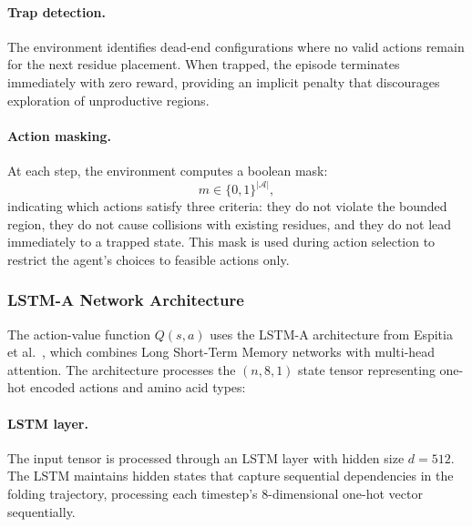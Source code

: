 \documentclass{article}
\theoremstyle{plain}
\theoremstyle{definition}
\begin{document}
\paragraph{Trap detection.} The environment identifies dead-end configurations where no valid actions remain for the next residue placement. When trapped, the episode terminates immediately with zero reward, providing an implicit penalty that discourages exploration of unproductive regions.

\paragraph{Action masking.} At each step, the environment computes a boolean mask:
\begin{equation}
m \in {\{0, 1\}}^{\lvert \mathcal{A} \rvert},
\end{equation}
indicating which actions satisfy three criteria: they do not violate the bounded region, they do not cause collisions with existing residues, and they do not lead immediately to a trapped state. This mask is used during action selection to restrict the agent's choices to feasible actions only.

\subsubsection{LSTM-A Network Architecture}

The action-value function $Q(s,a)$ uses the LSTM-A architecture from Espitia et al.\ \cite{Espitia2024}, which combines Long Short-Term Memory networks with multi-head attention. The architecture processes the $(n, 8, 1)$ state tensor representing one-hot encoded actions and amino acid types:

\paragraph{LSTM layer.} The input tensor is processed through an LSTM layer with hidden size $d = 512$. The LSTM maintains hidden states that capture sequential dependencies in the folding trajectory, processing each timestep's 8-dimensional one-hot vector sequentially.
\end{document}
